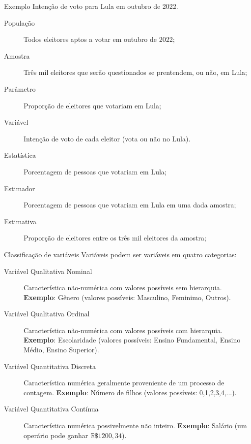 \documentclass[9pt]{beamer}
\begin{document}
\begin{frame}{Exemplo}
 Intenção de voto para Lula em outubro de 2022.
 
 \begin{description}
  \item[População] Todos eleitores aptos a votar em outubro de 2022;
  \vfill

  \item[Amostra] Três mil eleitores que serão questionados se prentendem, ou não, em Lula;
	\vfill

  \item[Parâmetro] Proporção de eleitores que votariam em Lula;
  \vfill


  \item[Variável] Intenção de voto de cada eleitor (vota ou não no Lula).
  \vfill

  \item[Estatística] Porcentagem de pessoas que votariam em Lula;
  \vfill

  \item[Estimador] Porcentagem de pessoas que votariam em Lula em uma dada amostra;
  \vfill
    
  \item[Estimativa] Proporção de eleitores entre os três mil eleitores da amostra;
  \vfill
 \end{description}
\end{frame}

\begin{frame}{Classificação de variáveis}
 Variáveis podem ser variáveis em quatro categorias:
 \begin{description}
  \item[Variável Qualitativa Nominal] Característica não-numérica com valores possíveis sem hierarquia. \textbf{Exemplo}: Gênero (valores possíveis: Masculino, Feminimo, Outros).
  \vfill
  
  \item[Variável Qualitativa Ordinal] Característica não-numérica com valores possíveis com hierarquia. \textbf{Exemplo}: Escolaridade (valores possíveis: Ensino Fundamental, Ensino Médio, Ensino Superior).
  \vfill
  
  \item[Variável Quantitativa Discreta] Característica numérica geralmente proveniente de um processo de contagem. \textbf{Exemplo}: Número de filhos (valores possíveis: 0,1,2,3,4,...).
  \vfill
  
  \item[Variável Quantitativa Contínua] Característica numérica possivelmente não inteiro. \textbf{Exemplo}: Salário (um operário pode ganhar $\mathbb{R}\$1200,34$).
 \end{description}
\end{frame}
\end{document}
